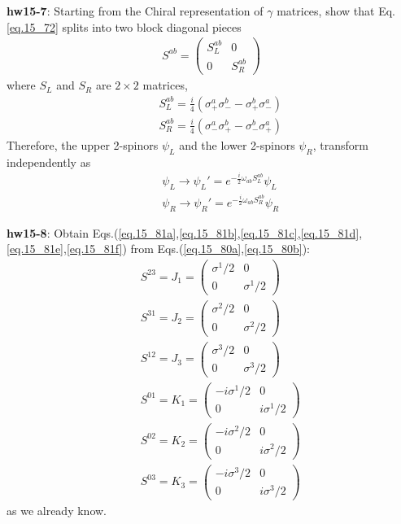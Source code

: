 \documentclass[12pt]{article}
\begin{document}
{{\bf hw15-7}: Starting from the Chiral representation of $\gamma$ matrices,
show that Eq.\ref{eq.15_72} splits into two block diagonal pieces
\begin{eqnarray}
  S^{ab}=
  \begin{pmatrix}
    S_L^{ab} & 0 \\
    0 & S_R^{ab}
  \end{pmatrix} \label{eq.15_78}
\end{eqnarray}
  where $S_L$ and $S_R$ are $2\times 2$ matrices,
\begin{eqnarray}
 && S_L^{ab} = \frac{i}{4} ( \sigma_+^a \sigma_-^b - \sigma_+^b \sigma_-^a )\label{eq.15_79a} \\
 && S_R^{ab} = \frac{i}{4} ( \sigma_-^a \sigma_+^b - \sigma_-^b \sigma_+^a )\label{eq.15_79b}
\end{eqnarray}
  Therefore, the upper 2-spinors $\psi_L$ and the lower 2-spinors $\psi_R$, transform independently as
\begin{eqnarray}
  && \psi_L \to \psi_L' = e^{ -\frac{i}{2} \omega_{ab} S_L^{ab} } \psi_L \label{eq.15_80a} \\ 
  && \psi_R \to \psi_R' = e^{ -\frac{i}{2} \omega_{ab} S_R^{ab} } \psi_R \label{eq.15_80b}
\end{eqnarray}
  
{\bf hw15-8}: Obtain Eqs.(\ref{eq.15_81a},\ref{eq.15_81b},\ref{eq.15_81c},\ref{eq.15_81d},\ref{eq.15_81e},\ref{eq.15_81f}) from Eqs.(\ref{eq.15_80a},\ref{eq.15_80b}):
\begin{eqnarray}
  &&S^{23} = J_1 =
  \begin{pmatrix}
    \sigma^1/2  &  0  \\ 
    0   &    \sigma^1/2
  \end{pmatrix}\label{eq.15_81a} \\
  &&S^{31} = J_2 =
  \begin{pmatrix}
    \sigma^2/2  &  0  \\ 
    0   &    \sigma^2/2
  \end{pmatrix}\label{eq.15_81b} \\
  &&S^{12} = J_3 =
  \begin{pmatrix}
    \sigma^3/2  &  0  \\ 
    0   &    \sigma^3/2
  \end{pmatrix}\label{eq.15_81c} \\
  &&S^{01} = K_1 =
  \begin{pmatrix}
    -i \sigma^1/2  &  0  \\ 
    0   &    i\sigma^1/2
  \end{pmatrix}\label{eq.15_81d} \\
  &&S^{02} = K_2 =
  \begin{pmatrix}
    -i\sigma^2/2  &  0  \\ 
    0   &    i\sigma^2/2
  \end{pmatrix}\label{eq.15_81e} \\
  &&S^{03} = K_3 =
  \begin{pmatrix}
    -i\sigma^3/2  &  0  \\ 
    0   &    i\sigma^3/2
  \end{pmatrix}\label{eq.15_81f}
\end{eqnarray}
  as we already know.

}
\end{document}
